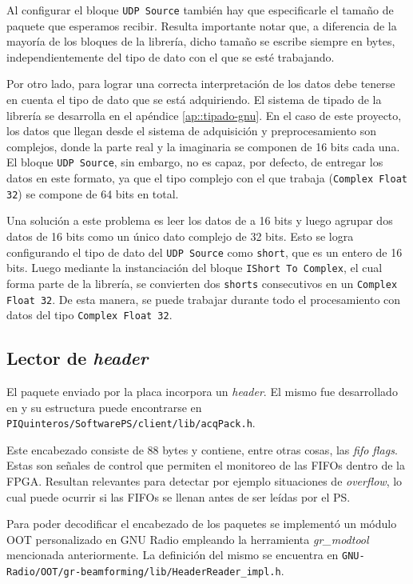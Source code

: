 \documentclass[../../main.tex]{subfiles}
\begin{document}
Al configurar el bloque \texttt{UDP Source} también hay que especificarle el tamaño de paquete que esperamos recibir. Resulta importante notar que, a diferencia de la mayoría de los bloques de la librería, dicho tamaño se escribe siempre en bytes, independientemente del tipo de dato con el que se esté trabajando.

Por otro lado, para lograr una correcta interpretación de los datos debe tenerse en cuenta el tipo de dato que se está adquiriendo. El sistema de tipado de la librería se desarrolla en el apéndice \ref{ap::tipado-gnu}. En el caso de este proyecto, los datos que llegan desde el sistema de adquisición y preprocesamiento son complejos, donde la parte real y la imaginaria se componen de 16 bits cada una.  El bloque \texttt{UDP Source}, sin embargo, no es capaz, por defecto, de entregar los datos en este formato, ya que el tipo complejo con el que trabaja (\texttt{Complex Float 32}) se compone de 64 bits en total.

Una solución a este problema es leer los datos de a 16 bits y luego agrupar dos datos de 16 bits como un único dato complejo de 32 bits. Esto se logra configurando el tipo de dato del \texttt{UDP Source} como \texttt{short}, que es un entero de 16 bits. Luego mediante la instanciación del bloque \texttt{IShort To Complex}, el cual forma parte de la librería, se convierten dos \texttt{shorts} consecutivos en un \texttt{Complex Float 32}. De esta manera, se puede trabajar durante todo el procesamiento con datos del tipo \texttt{Complex Float 32}.

\subsection{Lector de \textit{header}}
El paquete enviado por la placa incorpora un \textit{header}. El mismo fue desarrollado en \cite{proyecto-jose} y su estructura puede encontrarse en \texttt{PIQuinteros/SoftwarePS/client/lib/acqPack.h}.

Este encabezado consiste de 88 bytes y contiene, entre otras cosas, las \textit{fifo flags}. Estas son señales de control que permiten el monitoreo de las FIFOs dentro de la FPGA. Resultan relevantes para detectar por ejemplo situaciones de \textit{overflow}, lo cual puede ocurrir si las FIFOs se llenan antes de ser leídas por el PS.

Para poder decodificar el encabezado de los paquetes se implementó un módulo OOT personalizado en GNU Radio empleando la herramienta \textit{gr\_modtool} mencionada anteriormente. La definición del mismo se encuentra en \texttt{GNU-Radio/OOT/gr-beamforming/lib/HeaderReader\_impl.h}. 
\end{document}
